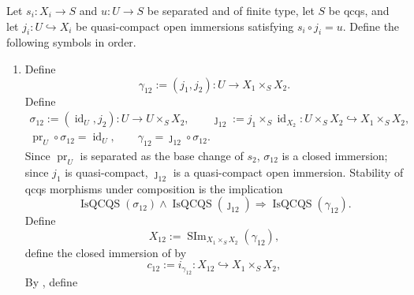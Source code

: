 \begin{definition}
  \label{def:nagata-common-modification}

  Let $s_i\colon X_i\to S$ and $u\colon U\to S$ be separated and of finite
  type, let $S$ be qcqs, and let
  $j_i\colon U\hookrightarrow X_i$ be quasi-compact open immersions satisfying
  $s_i\circ j_i=u$.  Define the following symbols in order.
  \begin{enumerate}
    \item Define
      \[
        \gamma_{12}:=(j_1,j_2)\colon U\to X_1\times_SX_2.          \tag{CM0}
      \]
      Define
      \[
      \begin{gathered}
        \sigma_{12}:=(\operatorname{id}_U,j_2)
          \colon U\to U\times_SX_2,\qquad
        \jmath_{12}:=j_1\times_S\operatorname{id}_{X_2}
          \colon U\times_SX_2\hookrightarrow X_1\times_SX_2,\\
        \operatorname{pr}_U\circ\sigma_{12}=\operatorname{id}_U,\qquad
        \gamma_{12}=\jmath_{12}\circ\sigma_{12}.
      \end{gathered}                                                \tag{CM0a}
      \]
      Since \(\operatorname{pr}_U\) is separated as the base change of
      \(s_2\), \(\sigma_{12}\) is a closed immersion; since \(j_1\) is
      quasi-compact, \(\jmath_{12}\) is a quasi-compact open immersion.
      Stability of qcqs morphisms under composition is the implication
      \[
        \operatorname{IsQCQS}(\sigma_{12})\wedge
        \operatorname{IsQCQS}(\jmath_{12})
          \Longrightarrow
        \operatorname{IsQCQS}(\gamma_{12}).                       \tag{CM0b}
      \]
      Define
      \[
        X_{12}:=\operatorname{SIm}_{X_1\times_SX_2}(\gamma_{12}),
      \]
      define the closed immersion of
       by
      \[
        c_{12}:=i_{\gamma_{12}}\colon
          X_{12}\hookrightarrow X_1\times_SX_2,
      \]
      By , define

\end{enumerate}
\end{definition}
